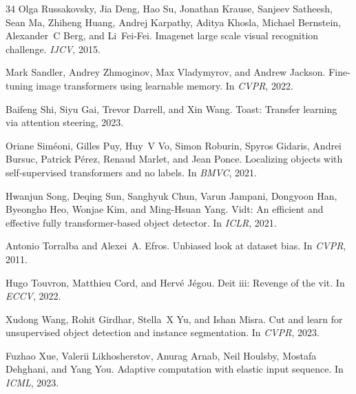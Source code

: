 \documentclass{article} \usepackage{iclr2024_conference,times}
\begin{document}
\begin{thebibliography}{34}
Olga Russakovsky, Jia Deng, Hao Su, Jonathan Krause, Sanjeev Satheesh, Sean Ma,
  Zhiheng Huang, Andrej Karpathy, Aditya Khosla, Michael Bernstein, Alexander~C
  Berg, and Li~Fei-Fei.
\newblock Imagenet large scale visual recognition challenge.
\newblock \emph{IJCV}, 2015.

Mark Sandler, Andrey Zhmoginov, Max Vladymyrov, and Andrew Jackson.
\newblock Fine-tuning image transformers using learnable memory.
\newblock In \emph{CVPR}, 2022.

Baifeng Shi, Siyu Gai, Trevor Darrell, and Xin Wang.
\newblock Toast: Transfer learning via attention steering, 2023.

Oriane Sim{\'e}oni, Gilles Puy, Huy~V Vo, Simon Roburin, Spyros Gidaris, Andrei
  Bursuc, Patrick P{\'e}rez, Renaud Marlet, and Jean Ponce.
\newblock Localizing objects with self-supervised transformers and no labels.
\newblock In \emph{BMVC}, 2021.

Hwanjun Song, Deqing Sun, Sanghyuk Chun, Varun Jampani, Dongyoon Han, Byeongho
  Heo, Wonjae Kim, and Ming-Hsuan Yang.
\newblock Vidt: An efficient and effective fully transformer-based object
  detector.
\newblock In \emph{ICLR}, 2021.

Antonio Torralba and Alexei~A. Efros.
\newblock Unbiased look at dataset bias.
\newblock In \emph{CVPR}, 2011.

Hugo Touvron, Matthieu Cord, and Herv{\'e} J{\'e}gou.
\newblock Deit iii: Revenge of the vit.
\newblock In \emph{ECCV}, 2022.

Xudong Wang, Rohit Girdhar, Stella~X Yu, and Ishan Misra.
\newblock Cut and learn for unsupervised object detection and instance
  segmentation.
\newblock In \emph{CVPR}, 2023.

Fuzhao Xue, Valerii Likhosherstov, Anurag Arnab, Neil Houlsby, Mostafa
  Dehghani, and Yang You.
\newblock Adaptive computation with elastic input sequence.
\newblock In \emph{ICML}, 2023.


\end{thebibliography}
\end{document}
